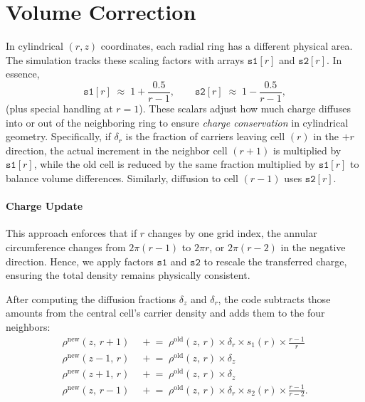 \section{Volume Correction}

In cylindrical $(r,z)$ coordinates, each radial ring has a different 
physical area. The simulation tracks these scaling factors with arrays 
\(\texttt{s1}[r]\) and \(\texttt{s2}[r]\). In essence,
\[
\texttt{s1}[r] \;\approx\; 1 + \frac{0.5}{r-1}, 
\qquad
\texttt{s2}[r] \;\approx\; 1 - \frac{0.5}{r-1},
\]
(plus special handling at $r=1$). These scalars adjust how much 
charge diffuses into or out of the neighboring ring to ensure 
\emph{charge conservation} in cylindrical geometry. Specifically, 
if $\delta_r$ is the fraction of carriers leaving cell $(r)$ in 
the $+r$ direction, the actual increment in the neighbor cell 
$(r+1)$ is multiplied by $\texttt{s1}[r]$, while the old cell is 
reduced by the same fraction multiplied by $\texttt{s1}[r]$ to 
balance volume differences. Similarly, diffusion to cell $(r-1)$ 
uses $\texttt{s2}[r]$.

\paragraph{Charge Update}

This approach enforces that if $r$ changes by one grid index, 
the annular circumference changes from $2\pi (r-1)$ to $2\pi r$, 
or $2\pi (r-2)$ in the negative direction. Hence, we apply factors
\(\texttt{s1}\) and \(\texttt{s2}\) to rescale the transferred 
charge, ensuring the total density remains physically consistent.

After computing the diffusion fractions $\delta_z$ and $\delta_r$, 
the code subtracts those amounts from the central cell's carrier density 
and adds them to the four neighbors:
\begin{align}
  \rho^{\mathrm{new}}(z,\,r+1) &\;\mathrel{+}= \;\rho^{\mathrm{old}}(z,\,r)\times\delta_r \times s_1(r) \times \frac{r-1}{r} \\
  \rho^{\mathrm{new}}(z-1,\,r) &\;\mathrel{+}= \;\rho^{\mathrm{old}}(z,\,r)\times\delta_z \\
  \rho^{\mathrm{new}}(z+1,\,r) &\;\mathrel{+}= \;\rho^{\mathrm{old}}(z,\,r)\times\delta_z \\
  \rho^{\mathrm{new}}(z,\,r-1) &\;\mathrel{+}= \;\rho^{\mathrm{old}}(z,\,r) \times \delta_r \times s_2(r) \times\frac{r-1}{r-2}.
\end{align}
 
